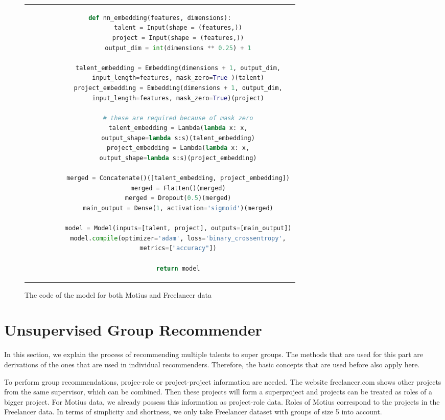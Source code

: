\begin{figure}[!ht]
	\centering
	\begin{tabular}{c}
		\begin{lstlisting}[language=Python]
		def nn_embedding(features, dimensions):
		  talent = Input(shape = (features,))
		  project = Input(shape = (features,))
		  output_dim = int(dimensions ** 0.25) + 1
		
		  talent_embedding = Embedding(dimensions + 1, output_dim,
		  input_length=features, mask_zero=True )(talent)
		  project_embedding = Embedding(dimensions + 1, output_dim,
		  input_length=features, mask_zero=True)(project)
		
		  # these are required because of mask zero
		  talent_embedding = Lambda(lambda x: x,
		  output_shape=lambda s:s)(talent_embedding)
		  project_embedding = Lambda(lambda x: x,
		  output_shape=lambda s:s)(project_embedding)
		
		  merged = Concatenate()([talent_embedding, project_embedding])
		  merged = Flatten()(merged)
		  merged = Dropout(0.5)(merged)
		  main_output = Dense(1, activation='sigmoid')(merged)
		
		  model = Model(inputs=[talent, project], outputs=[main_output])
		  model.compile(optimizer='adam', loss='binary_crossentropy',
		  metrics=["accuracy"])
		
		  return model
		\end{lstlisting}
	\end{tabular}
	\caption[Model Code]{The code of the model for both Motius and Freelancer data}\label{fig:model-code}
\end{figure}

\section{Unsupervised Group Recommender}\label{section:unsupervised-group-rec}

In this section, we explain the process of recommending multiple talents to super groups. The methods that are used for this part are derivations of the ones that are used in individual recommenders. Therefore, the basic concepts that are used before also apply here. 

To perform group recommendations, projec-role or project-project information are needed. The website freelancer.com shows other projects from the same supervisor, which can be combined. Then these projects will form a superproject and projects can be treated as roles of a bigger project. For Motius data, we already possess this information as project-role data. Roles of Motius correspond to the projects in the Freelancer data. In terms of simplicity and shortness, we only take Freelancer dataset with groups of size 5 into account. 

